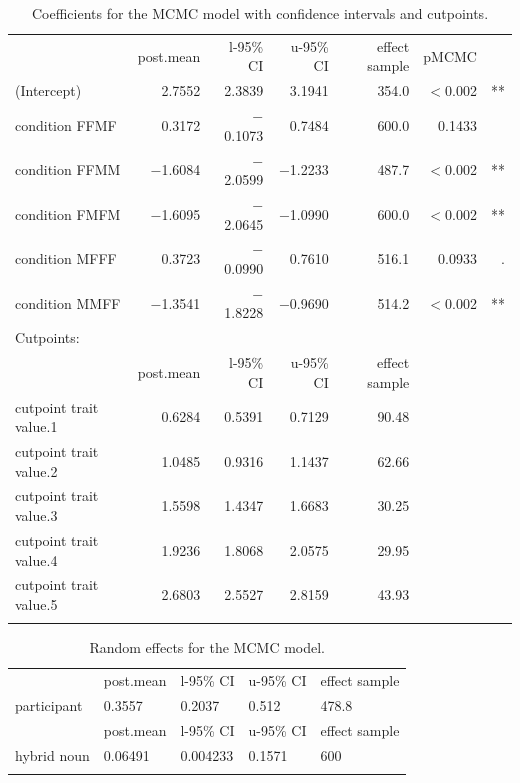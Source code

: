 \documentclass[output=paper,
modfonts,
newtxmath,
hidelinks
]{langscibook}
\begin{document}
\begin{table}[h]
\footnotesize

\begin{tabularx}{\textwidth}{lrrrrrr}
\lsptoprule
& post.mean & l-95\% CI & u-95\% CI & effect sample & pMCMC    &    \\
(Intercept)            & 2.7552    & 2.3839    & 3.1941    & 354.0         & $<$0.002 & ** \\
condition FFMF         & 0.3172    & $-$0.1073   & 0.7484    & 600.0         & 0.1433   &    \\
condition FFMM         & $-$1.6084   & $-$2.0599   & $-$1.2233   & 487.7         & $<$0.002 & ** \\
condition FMFM         & $-$1.6095   & $-$2.0645   & $-$1.0990   & 600.0         & $<$0.002 & ** \\
condition MFFF         & 0.3723    & $-$0.0990   & 0.7610    & 516.1         & 0.0933   & .  \\
condition MMFF         & $-$1.3541   & $-$1.8228   & $-$0.9690   & 514.2         & $<$0.002 & ** \\
\midrule
Cutpoints:                                                                                 \\
& post.mean & l-95\% CI & u-95\% CI & effect sample                 \\
cutpoint trait value.1 & 0.6284    & 0.5391    & 0.7129    & 90.48                         \\
cutpoint trait value.2 & 1.0485    & 0.9316    & 1.1437    & 62.66                         \\
cutpoint trait value.3 & 1.5598    & 1.4347    & 1.6683    & 30.25                         \\
cutpoint trait value.4 & 1.9236    & 1.8068    & 2.0575    & 29.95                         \\
cutpoint trait value.5 & 2.6803    & 2.5527    & 2.8159    & 43.93                         \\
\lspbottomrule
\end{tabularx}
\caption{Coefficients for the MCMC model with confidence intervals and cutpoints.}
\label{tab:estimates}
\end{table}


\begin{table}[h]
\centering
\footnotesize
\begin{tabularx}{\textwidth}{lXXXX}
\lsptoprule
& post.mean & l-95\% CI & u-95\% CI & effect sample \\
participant & 0.3557    & 0.2037    & 0.512     & 478.8         \\
\midrule
& post.mean & l-95\% CI & u-95\% CI & effect sample \\
hybrid noun & 0.06491   & 0.004233  & 0.1571    & 600           \\
\lspbottomrule
\end{tabularx}
\caption{Random effects for the MCMC model.}\label{tab:random-estimates}
\end{table}		
\end{document}
